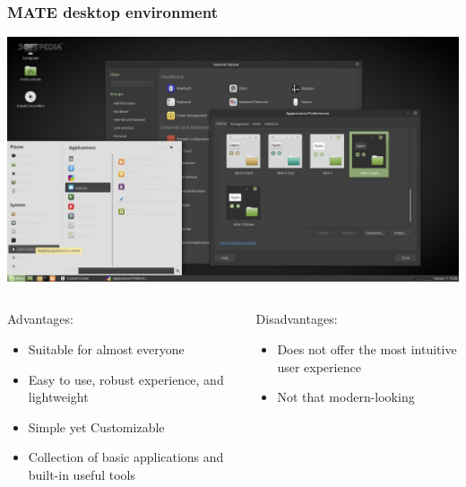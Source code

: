 \begin{frame}
	\frametitle{MATE desktop environment}
	
	\begin{center}
		\includegraphics[width=.7\linewidth]{../graphics/desktop_examples/mate.jpg}
	\end{center}%
	
	\vspace{-\baselineskip}
	
	\begin{columns}
		\begin{column}[t]{.7\linewidth}
			\begin{exampleblock}{Advantages:}
				\begin{itemize}
					\item Suitable for almost everyone
					\item Easy to use, robust experience, and lightweight
					\item Simple yet Customizable
					\item Collection of basic applications and built-in useful tools
				\end{itemize}
			\end{exampleblock}
		\end{column}
		\hfill
		\begin{column}[t]{.28\linewidth}
			\begin{alertblock}{Disadvantages:}
				\begin{itemize}
					\item Does not offer the most intuitive user experience
					\item Not that modern-looking
				\end{itemize}
			\end{alertblock}
		\end{column}
	\end{columns}
	\hfill
\end{frame}
